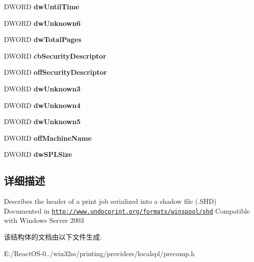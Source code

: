 \begin{DoxyCompactItemize}
D\+W\+O\+RD {\bfseries dw\+Until\+Time}
\item 
\mbox{\label{struct___s_h_d___h_e_a_d_e_r_ad7b745a7ab16c947f17914241374efb6}} 
D\+W\+O\+RD {\bfseries dw\+Unknown6}
\item 
\mbox{\label{struct___s_h_d___h_e_a_d_e_r_a11103fbc0e5888b817e9038678d30407}} 
D\+W\+O\+RD {\bfseries dw\+Total\+Pages}
\item 
\mbox{\label{struct___s_h_d___h_e_a_d_e_r_a1545ba7cfbde5ba839407ccf406a735b}} 
D\+W\+O\+RD {\bfseries cb\+Security\+Descriptor}
\item 
\mbox{\label{struct___s_h_d___h_e_a_d_e_r_af47674f4997f946a36f5786a3cb992ea}} 
D\+W\+O\+RD {\bfseries off\+Security\+Descriptor}
\item 
\mbox{\label{struct___s_h_d___h_e_a_d_e_r_a1ed78084f0e2c75711effdad41288b3f}} 
D\+W\+O\+RD {\bfseries dw\+Unknown3}
\item 
\mbox{\label{struct___s_h_d___h_e_a_d_e_r_abb69ef64d6645b5fcc08efb46d5e1d8d}} 
D\+W\+O\+RD {\bfseries dw\+Unknown4}
\item 
\mbox{\label{struct___s_h_d___h_e_a_d_e_r_a152561c2969a9f946220b37d1516bd89}} 
D\+W\+O\+RD {\bfseries dw\+Unknown5}
\item 
\mbox{\label{struct___s_h_d___h_e_a_d_e_r_a4f5546d6ee747b037a5cd70e2aa62fc2}} 
D\+W\+O\+RD {\bfseries off\+Machine\+Name}
\item 
\mbox{\label{struct___s_h_d___h_e_a_d_e_r_a8d6e5ccb87d567a4e8981deed9732711}} 
D\+W\+O\+RD {\bfseries dw\+S\+P\+L\+Size}
\end{DoxyCompactItemize}


\subsection{详细描述}
Describes the header of a print job serialized into a shadow file (.S\+HD) Documented in \href{http://www.undocprint.org/formats/winspool/shd}{\tt http\+://www.\+undocprint.\+org/formats/winspool/shd} Compatible with Windows Server 2003 

该结构体的文档由以下文件生成\+:\begin{DoxyCompactItemize}
\item 
E\+:/\+React\+O\+S-\/0../win32ss/printing/providers/localspl/precomp.\+h\end{DoxyCompactItemize}
